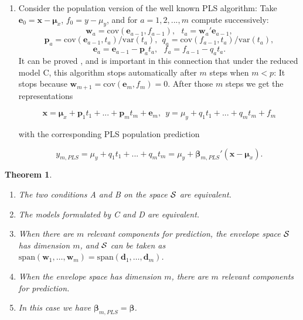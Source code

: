 \documentclass[a4paper, 11pt]{article}
\newtheorem{theorem}{Theorem} \newtheorem{principle}{Principle}
\begin{document}
\begin{enumerate}[label=\Alph*.]
\item Consider the  population version of the well known PLS algorithm: Take
  $\bm{e}_{0}=\bm{x}-\bm{\mu}_{x}$, $f_{0}=y-\mu_{y}$, and for $a=1,2,...,m$ compute successively:
  \begin{equation} \label{wt}\bm{w}_{a}=\mathrm{cov}(\bm{e}_{a-1}, f_{a-1}),\ \ \
    t_{a}=\bm{w}_{a}'\bm{e}_{a-1},\end{equation}
  \begin{equation}\label{pq}\bm{p}_{a}=\mathrm{cov}(\bm{e}_{a-1}, t_{a})/\mathrm{var}(t_{a}),\ \
    q_{a}=\mathrm{cov}(f_{a-1},t_{a})/\mathrm{var}(t_{a}),\end{equation}
  \[\bm{e}_{a}=\bm{e}_{a-1}-\bm{p}_{a}t_{a},\ \ \
    f_{a}=f_{a-1}-q_{a}t_{a}.\]
  It can be proved \citep{helland1990partial}, and is important in this connection that under the reduced model C, this algorithm stops automatically after $m$ steps when
  $m<p$: It stops because $\bm{w}_{m+1}=\mathrm{cov}(\bm{e}_{m},f_{m})=0$. After those $m$ steps we get the representations

  \begin{equation}
    \label{latent}
    \bm{x}=\bm{\mu}_{x}+\bm{p}_{1}t_{1}+...+\bm{p}_{m}t_{m}+\bm{e}_{m},\ \ y=\mu_{y}+q_{1}t_{1}+...+q_{m}t_{m}+ f_{m}
  \end{equation}

  with the corresponding PLS population prediction

  \[y_{m,PLS}=\mu_{y}+q_{1}t_{1}+...+q_{m}t_{m}=\mu_{y}+\bm{\beta}_{m,PLS}'(\bm{x}-\bm{\mu}_{x}).\]

\end{enumerate}

\smallskip

\begin{theorem} {\rm\citep{cook2013envelopes,helland1990partial}}
  \begin{enumerate}[label=(\alph*)]
  \item The two conditions A and B on the space $\cal{S}$ are equivalent.
  \item The models formulated by C and D are equivalent.
  \item When there are $m$ relevant components for prediction, the envelope space $\cal{S}$ has dimension $m$, and $\cal{S}$ can be taken as $\mathrm{span}\left(\bm{w}_{1}, \ldots, \bm{w}_{m}\right) = \mathrm{span}\left(\bm{d}_{1}, \ldots, \bm{d}_{m}\right)$.
  \item When the envelope space has dimension $m$, there are $m$ relevant components for prediction.
  \item In this case we have $\bm{\beta}_{m,PLS}=\bm{\beta}$.
  \end{enumerate}
\end{theorem}
\end{document}
